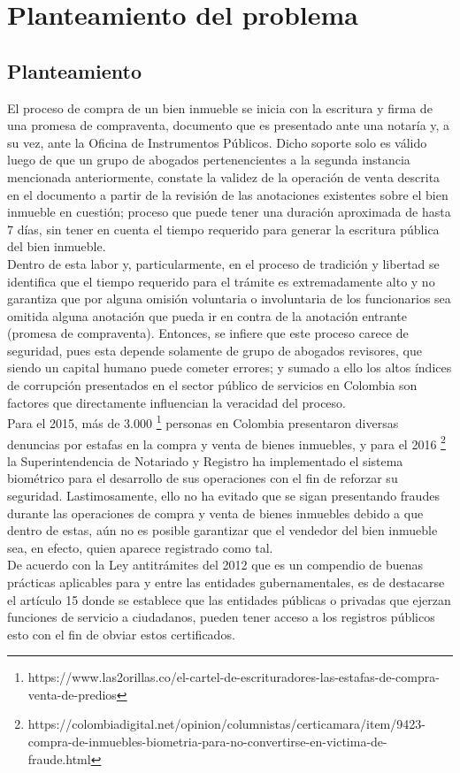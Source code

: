 \section{Planteamiento del problema}


\subsection{Planteamiento}

El proceso de compra de un bien inmueble se inicia con la escritura y firma de una promesa de compraventa, documento que es presentado ante una notaría y, a su vez, ante la Oficina de Instrumentos Públicos. Dicho soporte solo es válido luego de que un grupo de abogados pertenencientes a la segunda instancia mencionada anteriormente, constate la validez de la operación de venta descrita en el documento a partir de la revisión de las anotaciones existentes sobre el bien inmueble en cuestión; proceso que puede tener una duración aproximada de hasta 7 días, sin tener en cuenta el tiempo requerido para generar la escritura pública del bien inmueble.
\\
Dentro de esta labor y, particularmente, en el proceso de tradición y libertad se identifica que el tiempo requerido para el trámite es extremadamente alto y no garantiza que por alguna
omisión voluntaria o involuntaria de los funcionarios sea omitida alguna anotación que pueda ir en contra de la anotación entrante (promesa de compraventa). Entonces, se infiere que este proceso carece de seguridad, pues esta depende solamente de grupo de abogados revisores, que siendo un capital humano puede cometer errores; y sumado a ello los altos índices de corrupción presentados en el sector público de servicios en Colombia son factores que directamente influencian la veracidad del proceso. 
\\[0.5cm]
Para el 2015, más de 3.000 \footnote{https://www.las2orillas.co/el-cartel-de-escrituradores-las-estafas-de-compra-venta-de-predios} personas en Colombia presentaron diversas denuncias por estafas en la compra y venta de bienes inmuebles, y para el 2016 \footnote{https://colombiadigital.net/opinion/columnistas/certicamara/item/9423-compra-de-inmuebles-biometria-para-no-convertirse-en-victima-de-fraude.html} la Superintendencia de Notariado y Registro ha implementado el sistema biométrico para el desarrollo de sus operaciones con el fin de reforzar su seguridad. Lastimosamente, ello no ha evitado que se sigan presentando fraudes durante las operaciones de compra y venta de bienes inmuebles debido a que dentro de estas, aún no es posible garantizar que el vendedor del bien inmueble sea, en efecto, quien aparece registrado como tal.
\\
De acuerdo con la Ley antitrámites del 2012 que es un compendio de buenas prácticas aplicables para y entre las entidades gubernamentales, es de destacarse el artículo 15 donde se establece que las entidades públicas o privadas que ejerzan funciones de servicio a ciudadanos, pueden tener acceso a los registros públicos esto con el fin de obviar estos certificados.
\\

